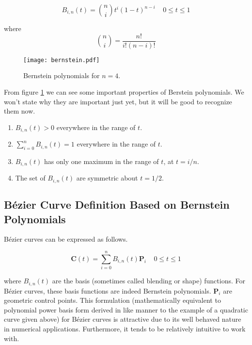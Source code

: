 \begin{equation} B_{i,n}(t) = {n\choose i} t^i (1-t)^{n-i} ~~~~~0\leq t \leq1 \end{equation}

where \begin{equation} {n\choose i} = \frac{n!}{i!(n-i)!} \end{equation} 

\begin{figure}[htbp]
	\centering
	\texttt{[image: bernstein.pdf]}
	\caption{Bernstein polynomials for $n=4$.}
	\label{fig:bernstein}
\end{figure}

From figure \cref{fig:bernstein} we can see some important properties of Berstein polynomials. We won't state why they are important just yet, but it will be good to recognize them now.

\begin{enumerate}
	\item $B_{i,n}(t) > 0$ everywhere in the range of $t$.
	\item $\sum_{i=0}^n B_{i,n}(t) = 1$ everywhere in the range of $t$.
	\item $B_{i,n}(t)$ has only one maximum in the range of $t$, at $t=i/n$.
	\item The set of  $B_{i,n}(t)$ are symmetric about $t=1/2$.
\end{enumerate}

\subsection{Bézier Curve Definition Based on Bernstein Polynomials}

Bézier curves can be expressed as follows.

\begin{equation} \textbf{C}(t) = \sum^n_{i=0}B_{i,n}(t) \textbf{P}_i~~~~~0\leq t \leq1 \end{equation}

where $B_{i,n}(t)$ are the basis (sometimes called blending or shape) functions. For Bézier curves, these basis functions are indeed Bernstein polynomials. \(\textbf{P}_i\) are geometric control points.  This formulation (mathematically equivalent to polynomial power basis form derived in like manner to the example of a quadratic curve given above) for Bézier curves is attractive due to its well behaved nature in numerical applications. Furthermore, it tends to be relatively intuitive to work with.

